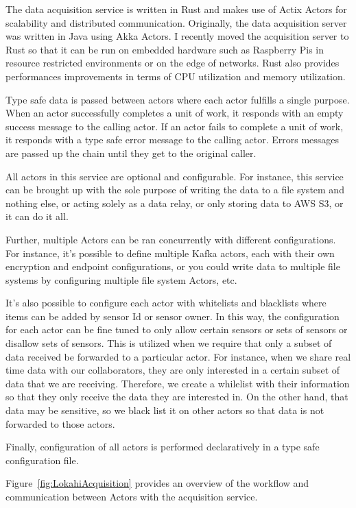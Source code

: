 The data acquisition service is written in Rust and makes use of Actix Actors for scalability and distributed communication. Originally, the data acquisition server was written in Java using Akka Actors. I recently moved the acquisition server to Rust so that it can be run on embedded hardware such as Raspberry Pis in resource restricted environments or on the edge of networks. Rust also provides performances improvements in terms of CPU utilization and memory utilization.

Type safe data is passed between actors where each actor fulfills a single purpose. When an actor successfully completes a unit of work, it responds with an empty success message to the calling actor. If an actor fails to complete a unit of work, it responds with a type safe error message to the calling actor. Errors messages are passed up the chain until they get to the original caller.

All actors in this service are optional and configurable. For instance, this service can be brought up with the sole purpose of writing the data to a file system and nothing else, or acting  solely as a data relay, or only storing data to AWS S3, or it can do it all.

Further, multiple Actors can be ran concurrently with different configurations. For instance, it's possible to define multiple Kafka actors, each with their own encryption and endpoint configurations, or you could write data to multiple file systems by configuring multiple file system Actors, etc.

It's also possible to configure each actor with whitelists and blacklists where items can be added by sensor Id or sensor owner. In this way, the configuration for each actor can be fine tuned to only allow certain sensors or sets of sensors or disallow sets of sensors. This is utilized when we require that only a subset of data received be forwarded to a particular actor. For instance, when we share real time data with our collaborators, they are only interested in a certain subset of data that we are receiving. Therefore, we create a whilelist with their information so that they only receive the data they are interested in. On the other hand, that data may be sensitive, so we black list it on other actors so that data is not forwarded to those actors.

Finally, configuration of all actors is performed declaratively in a type safe configuration file.

Figure~\ref{fig:LokahiAcquisition} provides an overview of the workflow and communication between Actors with the acquisition service.

